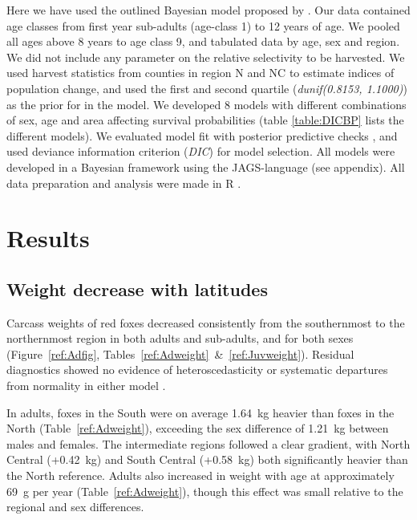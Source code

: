 \documentclass[PCJ,Unicode,screen]{cedram}
\begin{document}
Here we have used the outlined Bayesian model proposed by \citet{skellyFlexibleBayesianApproach}. Our data contained age classes from first year sub-adults (age-class 1) to 12 years of age. We pooled all ages above 8 years to age class 9, and tabulated data by age, sex and region. We did not include any parameter on the relative selectivity to be harvested. We used harvest statistics from counties in region N and NC to estimate indices of population change, and used the first and second quartile (\emph{dunif(0.8153, 1.1000)}) as the prior for \lambda in the model. We developed 8 models  with different combinations of sex, age and area affecting survival probabilities (table \ref{table:DICBP} lists the different models). We evaluated model fit with posterior predictive checks \citep{kery2010introduction}, and used deviance information criterion (\emph{DIC}) for model selection. All models were developed in a Bayesian framework using the JAGS-language \citep{plummer2003jags} (see appendix). All data preparation and analysis were made in R \citep{rcoreteamLanguageEnvironmentStatistical2024}.

\section*{Results}

\subsection*{Weight decrease with latitudes}

Carcass weights of red foxes decreased consistently from the southernmost to the northernmost region in both adults and sub-adults, and for both sexes (Figure~\ref{ref:Adfig}, Tables~\ref{ref:Adweight}~\&~\ref{ref:Juvweight}). Residual diagnostics showed no evidence of heteroscedasticity or systematic departures from normality in either model \citep{hartigDHARMaResidualDiagnostics2022}.

In adults, foxes in the South were on average 1.64~kg heavier than foxes in the North (Table~\ref{ref:Adweight}), exceeding the sex difference of 1.21~kg between males and females. The intermediate regions followed a clear gradient, with North Central (+0.42~kg) and South Central (+0.58~kg) both significantly heavier than the North reference. Adults also increased in weight with age at approximately 69~g per year (Table~\ref{ref:Adweight}), though this effect was small relative to the regional and sex differences.
\end{document}
